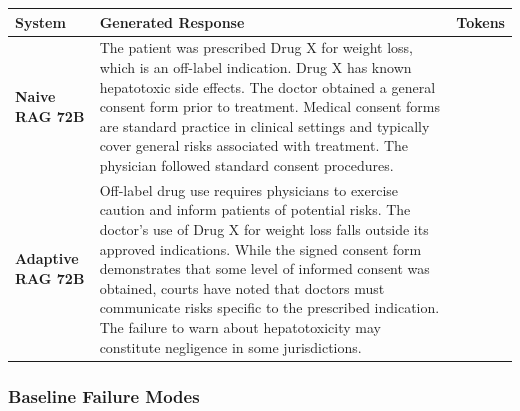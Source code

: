 \documentclass[a4paper,fleql]{cas-sc}
\begin{document}
\begin{center}
\begingroup
{}
\label{tab:casestudy_72b}
\renewcommand{\arraystretch}{1.4}
\footnotesize
\begin{tabular}{m{2.9cm} | m{9.6cm} | >{\centering\arraybackslash}m{1.5cm}}
\toprule
\textbf{System} & \textbf{Generated Response} & \textbf{Tokens} \\
\midrule
\textbf{Naive RAG 72B}
& The patient was prescribed Drug X for weight loss, which is an off-label
indication. Drug X has known hepatotoxic side effects. The doctor obtained a
general consent form prior to treatment. Medical consent forms are standard
practice in clinical settings and typically cover general risks associated
with treatment. The physician followed standard consent procedures. & 71 \\
\midrule
\textbf{Adaptive RAG 72B}
& Off-label drug use requires physicians to exercise caution and inform
patients of potential risks. The doctor's use of Drug X for weight loss falls
outside its approved indications. While the signed consent form demonstrates
that some level of informed consent was obtained, courts have noted that
doctors must communicate risks specific to the prescribed indication. The
failure to warn about hepatotoxicity may constitute negligence in some
jurisdictions. & 88 \\
\bottomrule
\end{tabular}
\endgroup
\end{center}
\vspace{6pt plus 4pt minus 3pt}
\subsubsection{Baseline Failure Modes}
\label{sssec:baseline-failures}
\end{document}
